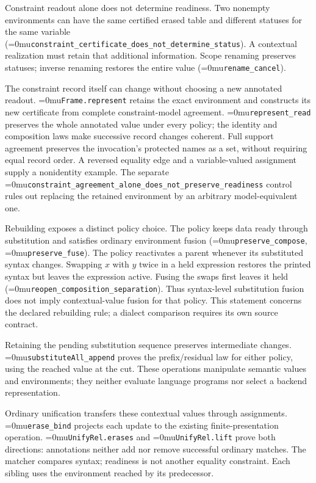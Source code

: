 \documentclass[11pt,a4paper]{article}
\newcommand{\code}[1]{\texttt{\detokenize{#1}}}
\newcommand{\name}[1]{\textup{\Urlmuskip=0mu\relax\nolinkurl{#1}}}
\begin{document}
Constraint readout alone does not determine readiness. Two nonempty
environments can have the same certified erased table and different statuses
for the same variable
(\name{constraint_certificate_does_not_determine_status}). A contextual
realization must retain that additional information. Scope renaming preserves
statuses; inverse renaming restores the entire value
(\name{rename_cancel}).

The constraint record itself can change without choosing a new annotated
readout. \name{Frame.represent} retains the exact environment and constructs
its new certificate from complete constraint-model agreement.
\name{represent_read} preserves the whole annotated value under every policy;
the identity and composition laws make successive record changes coherent.
Full support agreement preserves the invocation's protected names as a set,
without requiring equal record order. A reversed equality edge and a
variable-valued assignment supply a nonidentity example. The separate
\name{constraint_agreement_alone_does_not_preserve_readiness} control rules
out replacing the retained environment by an arbitrary model-equivalent one.

Rebuilding exposes a distinct policy choice. The \code{preserve} policy keeps
data ready through substitution and satisfies ordinary environment fusion
(\name{preserve_compose}, \name{preserve_fuse}). The
\code{reopenChanged} policy reactivates a parent whenever its substituted
syntax changes. Swapping $x$ with $y$ twice in a held expression restores the
printed syntax but leaves the expression active. Fusing the swaps first
leaves it held (\name{reopen_composition_separation}). Thus syntax-level
substitution fusion does not imply contextual-value fusion for that policy.
This statement concerns the declared rebuilding rule; a dialect comparison
requires its own source contract.

Retaining the pending substitution sequence preserves intermediate changes.
\name{substituteAll_append} proves the prefix/residual law for either policy,
using the reached value at the cut. These operations manipulate semantic
values and environments; they neither evaluate language programs nor select
a backend representation.

Ordinary unification transfers these contextual values through assignments.
\name{erase_bind} projects each update to the existing finite-presentation
operation. \name{UnifyRel.erases} and \name{UnifyRel.lift} prove both
directions: annotations neither add nor remove successful ordinary matches.
The matcher compares syntax; readiness is not another equality constraint.
Each sibling uses the environment reached by its predecessor.
\end{document}
